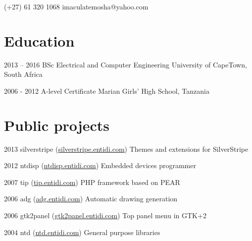 \documentclass[fontsize=9pt]{tccv}
\begin{document}
    {(+27) 61 320 1068}
    {imaculatemosha@yahoo.com}

\section{Education}

\begin{yearlist}

\item{2013 -- 2016}
     {BSc Electrical and Computer Engineering}
     {University of CapeTown, South Africa}

\item{2006 - 2012}
     {A-level Certificate}
     {Marian Girls' High School, Tanzania}

\end{yearlist}

\section{Public projects}

\begin{yearlist}

\item{2013}
     {silverstripe (\href{http://silverstripe.entidi.com/}{silverstripe.entidi.com})}
     {Themes and extensions for SilverStripe}

\item{2012}
     {ntdisp (\href{http://ntdisp.entidi.com/}{ntdisp.entidi.com})}
     {Embedded devices programmer}

\item{2007}
     {tip (\href{http://tip.entidi.com/}{tip.entidi.com})}
     {PHP framework based on PEAR}

\item{2006}
     {adg (\href{http://adg.entidi.com/}{adg.entidi.com})}
     {Automatic drawing generation}

\item{2006}
     {gtk2panel (\href{http://gtk2panel.entidi.com/}{gtk2panel.entidi.com})}
     {Top panel menu in GTK+2}

\item{2004}
     {ntd (\href{http://ntd.entidi.com/}{ntd.entidi.com})}
     {General purpose libraries}

\end{yearlist}
\end{document}
